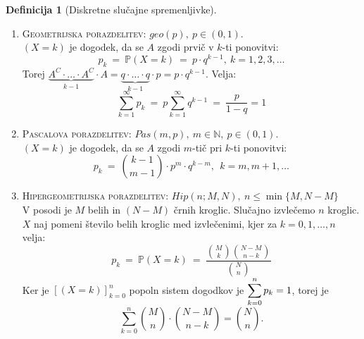 \documentclass[11pt]{article}
\theoremstyle{definition}
\newtheorem{definicija}{Definicija}[section]
\theoremstyle{definition}
\theoremstyle{definition}
\begin{document}
\begin{definicija}[Diskretne slučajne spremenljivke]
\begin{enumerate}
	\item \textsc{Geometrijska porazdelitev}: $geo(p), ~p \in (0, 1)$.\\
	$(X = k)$ je dogodek, da se $A$ zgodi prvič v $k$-ti ponovitvi:
	$$p_k ~=~ \mathbb{P}(X = k) ~=~ p \cdot q^{k-1}, ~k = 1, 2, 3, \ldots$$
	Torej $\underbrace{A^C \cdot \ldots \cdot A^C}_{k-1} \cdot A = \underbrace{q \cdot \ldots \cdot q}_{k-1} \cdot p = p \cdot q^{k-1}.$ Velja:
	$$\sum_{k=1}^{\infty} p_k ~=~ p \sum_{k=1}^{\infty} q^{k-1} ~=~ \frac{p}{1-q} = 1$$
	
	\item \textsc{Pascalova porazdelitev}: $Pas(m, p), ~m \in \mathbb{N}, ~p \in (0, 1).$\\
	$(X = k)$ je dogodek, da se $A$ zgodi $m$-tič pri $k$-ti ponovitvi:
	$$p_k ~=~ \binom{k-1}{m-1} \cdot p^m \cdot q^{k-m}, ~~k = m, m+1, \ldots$$
	
	\item \textsc{Hipergeometrijska porazdelitev}: $Hip(n; M, N), ~n \leq \min{\{M, N-M\}}$\\
	V posodi je $M$ belih in $(N-M)$ črnih kroglic. Slučajno izvlečemo $n$ kroglic. $X$ naj pomeni število belih kroglic med izvlečenimi, kjer za $k = 0, 1, \ldots, n$ velja:
	$$p_k ~=~ \mathbb{P}(X = k) ~=~ \frac{\binom{M}{k} \binom{N-M}{n-k}}{\binom{N}{n}}$$
	Ker je $\left[(X = k)\right]_{k=0}^n$ popoln sistem dogodkov je $\mathlarger{\sum_{k=0}^n p_k = 1}$, torej je
	$$\sum_{k=0}^n \binom{M}{n} \cdot \binom{N-M}{n-k} = \binom{N}{n}.$$
\end{enumerate}

\end{definicija}
\vspace{0.5cm}
\end{document}
